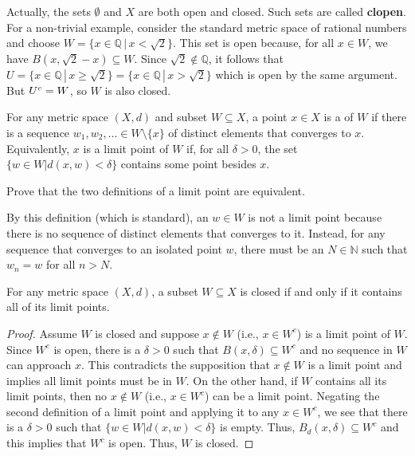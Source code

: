Actually, the sets $\emptyset$ and $X$ are both open and closed.
Such sets are called \textbf{clopen}.
For a non-trivial example, consider the standard metric space of rational numbers and choose $W = \{x\in \mathbb{Q}\,|\, x< \sqrt{2}\}$.
This set is open because, for all $x\in W$, we have $B(x,\sqrt{2}-x)\subseteq W$.
Since $\sqrt{2}\notin \mathbb{Q}$, it follows that $U = \{x\in \mathbb{Q}\,|\, x\geq \sqrt{2}\}=\{x\in \mathbb{Q}\,|\, x> \sqrt{2}\}$ which is open by the same argument.
But ${U}^{c} = W$, so $W$ is also closed.

\begin{definition}
For any metric space $(X,d)$ and subset $W \subseteq X$, a point $x\in X$ is a  of $W$ if there is a sequence $w_1,w_2,\ldots\in W \setminus \{ x \}$ of distinct elements that converges to $x$.
Equivalently, $x$ is a limit point of $W$ if, for all $\delta >0$, the set $\{ w\in W | d(x,w)<\delta \}$ contains some point besides $x$.
\end{definition}

\begin{problem}
Prove that the two definitions of a limit point are equivalent.
\end{problem}

By this definition (which is standard), an  $w\in W$ is not a limit point because there is no sequence of distinct elements that converges to it.
Instead, for any sequence that converges to an isolated point $w$, there must be an $N\in \mathbb{N}$ such that $w_n = w$ for all $n>N$. 

\begin{theorem}
For any metric space $(X,d)$, a subset $W \subseteq X$ is closed if and only if it contains all of its limit points.
\end{theorem}

\begin{proof}
Assume $W$ is closed and suppose $x \notin W$ (i.e., $x \in W^c$) is a limit point of $W$.
Since $W^c$ is open, there is a $\delta > 0$ such that $B(x,\delta) \subseteq W^c$ and no sequence in $W$ can approach $x$. This contradicts the supposition that $x \notin W$ is a limit point and implies all limit points must be in $W$.
On the other hand, if $W$ contains all its limit points, then no $x \notin W$ (i.e., $x\in W^c$) can be a limit point.
Negating the second definition of a limit point and applying it to any $x \in W^c$, we see that there is a $\delta > 0$ such that $\{ w\in W | d(x,w)<\delta \}$ is empty.
Thus, $B_d (x,\delta) \subseteq W^c$ and this implies that $W^c$ is open.
Thus, $W$ is closed.
\end{proof}

